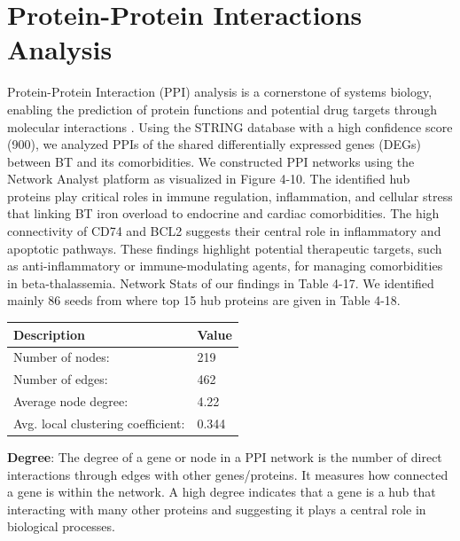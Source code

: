 \section{Protein-Protein Interactions Analysis}
\label{sec:sec4_6}
Protein-Protein Interaction (PPI) analysis is a cornerstone of systems biology, enabling the prediction of protein functions and potential drug targets through molecular interactions \cite{b7}. Using the STRING database with a high confidence score (900), we analyzed PPIs of the shared differentially expressed genes (DEGs) between BT and its comorbidities. We constructed PPI networks using the Network Analyst platform as visualized in Figure 4-10. The identified hub proteins play critical roles in immune regulation, inflammation, and cellular stress that linking BT iron overload to endocrine and cardiac comorbidities. The high connectivity of CD74 and BCL2 suggests their central role in inflammatory and apoptotic pathways. These findings highlight potential therapeutic targets, such as anti-inflammatory or immune-modulating agents, for managing comorbidities in beta-thalassemia. Network Stats of our findings in Table 4-17. We identified mainly 86 seeds from where top 15 hub proteins are given in Table 4-18. \\

\begin{table}[H]
    \centering
    \begin{tabular}{|p{4cm}|p{3cm}|}
        \hline
        \textbf{Description} & \textbf{Value} \\
        \hline
        Number of nodes: & 219 \\
        \hline
        Number of edges: & 462 \\
        \hline
        Average node degree: & 4.22 \\
        \hline
        Avg. local clustering coefficient: & 0.344 \\
        \hline
    \end{tabular}
    \label{tab:network_stats_ppi}
\end{table}

\textbf{Degree}: The degree of a gene or node in a PPI network is the number of direct interactions through edges with other genes/proteins. It measures how connected a gene is within the network. A high degree indicates that a gene is a hub that interacting with many other proteins and suggesting it plays a central role in biological processes.\\

